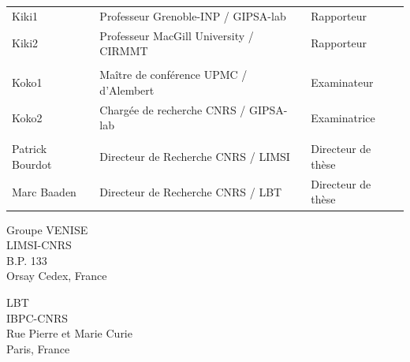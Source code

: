 \begin{titlepage}
\begin{center}
\begin{tabular}{l l l}
	Kiki1	 	& Professeur Grenoble-INP / GIPSA-lab				& Rapporteur\\ 
	Kiki2 		& Professeur MacGill University	/ CIRMMT			& Rapporteur\\ %
	& &\\
	Koko1 		& Maître de conférence UPMC / d'Alembert		 	& Examinateur\\ 
	Koko2		& Chargée de recherche CNRS / GIPSA-lab				& Examinatrice\\ 
	& &\\	
	Patrick Bourdot 	& Directeur de Recherche CNRS / LIMSI				& Directeur de thèse\\ 
	Marc Baaden 	& Directeur de Recherche CNRS / LBT				& Directeur de thèse\\ 
	
	\end{tabular}
\end{center}






\setlength{\columnsep}{7mm}
\setlength{\columnseprule}{0pt}

\begin{multicols}{2} 
\small 
\noindent Groupe VENISE	\\	
\noindent LIMSI-CNRS					\\
\noindent B.P. 133				\\
 Orsay Cedex, France \\	

\columnbreak

\raggedleft LBT \\
\noindent IBPC-CNRS \\
 Rue Pierre et Marie Curie  \\
 Paris, France
\end{multicols}



\end{titlepage}